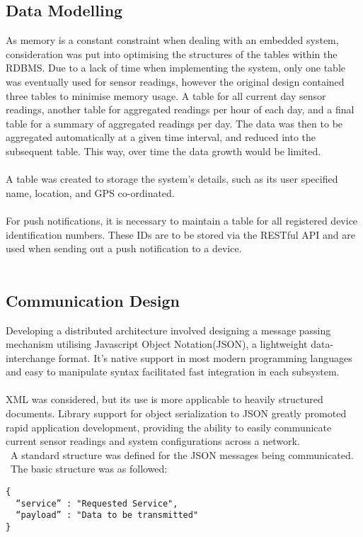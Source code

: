 \documentclass{article}
\begin{document}
\subsection{Data Modelling}
As memory is a constant constraint when dealing with an embedded system, consideration was put into optimising the structures of the tables within the RDBMS. Due to a lack of time when implementing the system, only one table was eventually used for sensor readings, however the original design contained three tables to minimise memory usage. A table for all current day sensor readings, another table for aggregated readings per hour of each day, and a final table for a summary of aggregated readings per day. The data was then to be aggregated automatically at a given time interval, and reduced into the subsequent table. This way, over time the data growth would be limited. \\\\
A table was created to storage the system’s details, such as its user specified name, location, and GPS co-ordinated. \\\\
For push notifications, it is necessary to maintain a table for all registered device identification numbers. These IDs are to be stored via the RESTful API and are used when sending out a push notification to a device. \\\

\subsection{Communication Design}
Developing a distributed architecture involved designing a message passing mechanism utilising Javascript Object Notation(JSON), a lightweight data-interchange format. It’s native support in most modern programming languages and easy to manipulate syntax facilitated fast integration in each subsystem. \\\\
XML was considered, but its use is more applicable to heavily structured documents.  Library support for object serialization to JSON greatly promoted rapid application development, providing the ability to easily communicate current sensor readings and system configurations across a network. \\\ A standard structure was defined for the JSON messages being communicated. \\\ The basic structure was as followed: 
\begin{lstlisting}[caption={JSON Message Structure},label={lst:json_message}]
{ 
  “service” : "Requested Service",
  “payload” : "Data to be transmitted"
}
\end{lstlisting}
\end{document}
